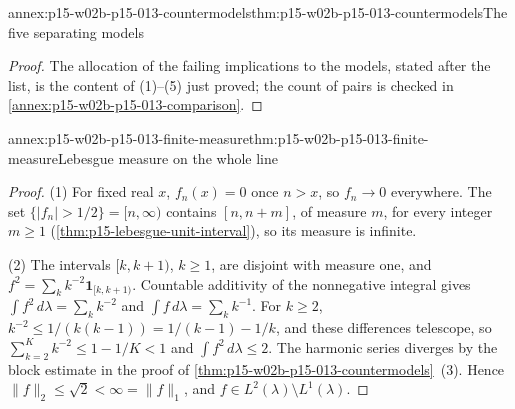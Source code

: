 \begin{annexitem}{annex:p15-w02b-p15-013-countermodels}{thm:p15-w02b-p15-013-countermodels}{The five separating models}
\begin{proof}
The allocation of the failing implications to the models, stated after
the list, is the content of (1)--(5) just proved; the count of pairs is
checked in \cref{annex:p15-w02b-p15-013-comparison}.
\end{proof}
\end{annexitem}

\begin{annexitem}{annex:p15-w02b-p15-013-finite-measure}{thm:p15-w02b-p15-013-finite-measure}{Lebesgue measure on the whole line}
\begin{proof}
(1) For fixed real \(x\), \(f_n(x)=0\) once \(n>x\), so \(f_n\to0\)
everywhere. The set \(\{|f_n|>1/2\}=[n,\infty)\) contains
\([n,n+m]\), of measure \(m\), for every integer \(m\geq1\)
(\cref{thm:p15-lebesgue-unit-interval}), so its measure is infinite.

(2) The intervals \([k,k+1)\), \(k\geq1\), are disjoint with measure
one, and \(f^2=\sum_kk^{-2}\mathbf1_{[k,k+1)}\). Countable additivity
of the nonnegative integral gives \(\int f^2\,d\lambda=\sum_kk^{-2}\)
and \(\int f\,d\lambda=\sum_kk^{-1}\). For \(k\geq2\),
\(k^{-2}\leq1/(k(k-1))=1/(k-1)-1/k\), and these differences telescope,
so \(\sum_{k=2}^Kk^{-2}\leq1-1/K<1\) and \(\int f^2\,d\lambda\leq2\).
The harmonic series diverges by the block estimate in the proof of
\cref{thm:p15-w02b-p15-013-countermodels}~(3). Hence
\(\|f\|_2\leq\sqrt2<\infty=\|f\|_1\), and
\(f\in L^2(\lambda)\setminus L^1(\lambda)\).
\end{proof}
\end{annexitem}
